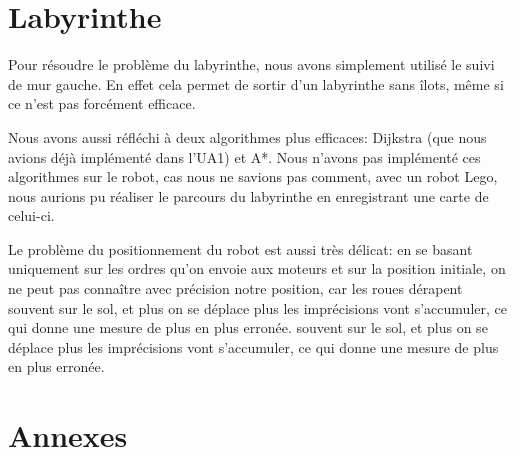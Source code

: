 \documentclass{scrartcl}
\begin{document}
\section{Labyrinthe}
  Pour résoudre le problème du labyrinthe, nous avons simplement utilisé le
  suivi de mur gauche. En effet cela permet de sortir d'un labyrinthe sans
  îlots, même si ce n'est pas forcément efficace.

  Nous avons aussi réfléchi à deux algorithmes plus efficaces: Dijkstra (que
  nous avions déjà implémenté dans l'UA1) et A*.  Nous n'avons pas implémenté
  ces algorithmes sur le robot, cas nous ne savions pas comment, avec un robot
  Lego, nous aurions pu réaliser le parcours du labyrinthe en enregistrant une
  carte de celui-ci.

  Le problème du positionnement du robot est aussi très délicat: en se basant
  uniquement sur les ordres qu'on envoie aux moteurs et sur la position initiale,
  on ne peut pas connaître avec précision notre position, car les roues dérapent
  souvent sur le sol, et plus on se déplace plus les imprécisions vont s'accumuler,
  ce qui donne une mesure de plus en plus erronée.
  souvent sur le sol, et plus on se déplace plus les imprécisions vont
  s'accumuler, ce qui donne une mesure de plus en plus erronée.

\section{Annexes}
\lstlistoflistings

\end{document}

